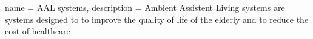 
{
	name = {AAL systems},
	description = {Ambient Assistent Living systems are systems designed to to improve the quality of life of the elderly and to reduce the cost of healthcare}
}
